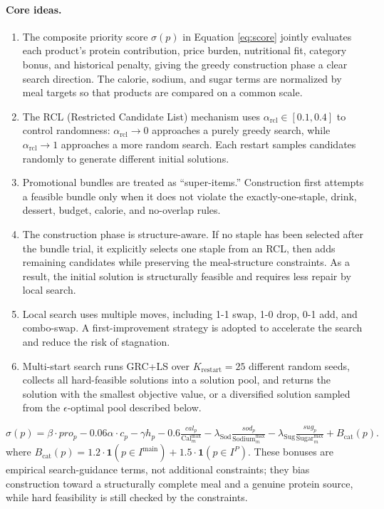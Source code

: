 \documentclass[a4paper]{article}
\begin{document}
\paragraph{Core ideas.}
\begin{enumerate}
\item The composite priority score $\sigma(p)$ in Equation \ref{eq:score} jointly evaluates each product's protein contribution, price burden, nutritional fit, category bonus, and historical penalty, giving the greedy construction phase a clear search direction. The calorie, sodium, and sugar terms are normalized by meal targets so that products are compared on a common scale.
\item The RCL (Restricted Candidate List) mechanism uses $\alpha_{\text{rcl}}\in[0.1,0.4]$ to control randomness: $\alpha_{\text{rcl}}\to 0$ approaches a purely greedy search, while $\alpha_{\text{rcl}}\to 1$ approaches a more random search. Each restart samples candidates randomly to generate different initial solutions.
\item Promotional bundles are treated as ``super-items.'' Construction first attempts a feasible bundle only when it does not violate the exactly-one-staple, drink, dessert, budget, calorie, and no-overlap rules.
\item The construction phase is structure-aware. If no staple has been selected after the bundle trial, it explicitly selects one staple from an RCL, then adds remaining candidates while preserving the meal-structure constraints. As a result, the initial solution is structurally feasible and requires less repair by local search.
\item Local search uses multiple moves, including 1-1 swap, 1-0 drop, 0-1 add, and combo-swap. A first-improvement strategy is adopted to accelerate the search and reduce the risk of stagnation.
\item Multi-start search runs GRC+LS over $K_{\text{restart}}=25$ different random seeds, collects all hard-feasible solutions into a solution pool, and returns the solution with the smallest objective value, or a diversified solution sampled from the $\epsilon$-optimal pool described below.
\end{enumerate}
\begin{equation}\label{eq:score}
\sigma(p) = \beta \cdot pro_p - 0.06\alpha\cdot c_p - \gamma h_p - 0.6\tfrac{cal_p}{\text{Cal}^{\max}_m} - \lambda_{\text{Sod}}\tfrac{sod_p}{\text{Sodium}^{\max}_m} - \lambda_{\text{Sug}}\tfrac{sug_p}{\text{Sugar}^{\max}_m} + B_{\text{cat}}(p).
\end{equation}
where $B_{\text{cat}}(p) = 1.2 \cdot \mathbf{1}(p\in I^{\mathrm{main}}) + 1.5\cdot \mathbf{1}(p\in I^P)$. These bonuses are empirical search-guidance terms, not additional constraints; they bias construction toward a structurally complete meal and a genuine protein source, while hard feasibility is still checked by the constraints.
\end{document}

